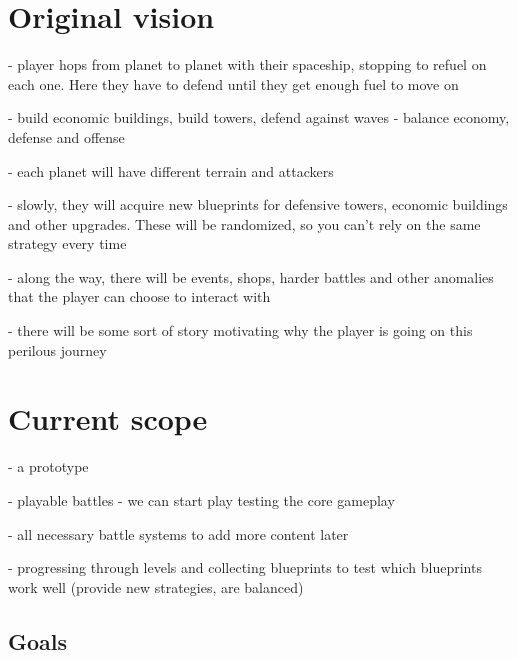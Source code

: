 \section{Original vision}

- player hops from planet to planet with their spaceship, stopping to refuel on each one. Here they have to defend until they get enough fuel to move on

- build economic buildings, build towers, defend against waves - balance economy, defense and offense

- each planet will have different terrain and attackers

- slowly, they will acquire new blueprints for defensive towers, economic buildings and other upgrades. These will be randomized, so you can't rely on the same strategy every time

- along the way, there will be events, shops, harder battles and other anomalies that the player can choose to interact with

- there will be some sort of story motivating why the player is going on this perilous journey

\section{Current scope}

- a prototype

- playable battles - we can start play testing the core gameplay

- all necessary battle systems to add more content later

- progressing through levels and collecting blueprints to test which blueprints work well (provide new strategies, are balanced)

\subsection{Goals}
